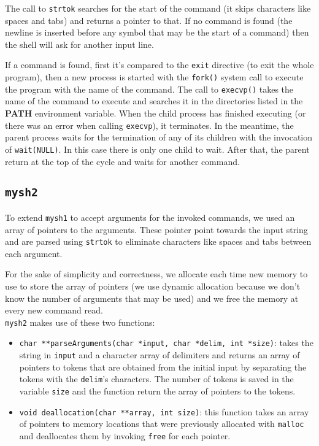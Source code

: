 The call to \texttt{strtok} searches for the start of the command (it skips characters like spaces and tabs) and returns a pointer to that. If no command is found (the newline is inserted before any symbol that may be the start of a command) then the shell will ask for another input line. \newline

If a command is found, first it's compared to the \texttt{exit} directive (to exit the whole program), then a new process is started with the \texttt{fork()} system call to execute the program with the name of the command. The call to \texttt{execvp()} takes the name of the command to execute and searches it in the directories listed in the \textbf{PATH} environment variable.
When the child process has finished executing (or there was an error when calling \texttt{execvp}), it terminates. In the meantime, the parent process waits for the termination of any of its children with the invocation of \texttt{wait(NULL)}. In this case there is only one child to wait. After that, the parent return at the top of the cycle and waits for another command.
\subsection{\texttt{mysh2}}
To extend \texttt{mysh1} to accept arguments for the invoked commands, we used an array of pointers to the arguments. These pointer point towards the input string and are parsed using \texttt{strtok} to eliminate characters like spaces and tabs between each argument. \newline

For the sake of simplicity and correctness, we allocate each time new memory to use to store the array of pointers (we use dynamic allocation because we don't know the number of arguments that may be used) and we free the memory at every new command read. \\ 

\texttt{mysh2} makes use of these two functions:
\begin{itemize}
\item{\texttt{char **parseArguments(char *input, char *delim, int *size)}}: takes the string in \texttt{input} and a character array of delimiters and returns an array of pointers to tokens that are obtained from the initial input by separating the tokens with the \texttt{delim}'s characters. The number of tokens is saved in the variable \texttt{size} and the function return the array of pointers to the tokens.
\item{\texttt{void deallocation(char **array, int size)}}: this function takes an array of pointers to memory locations that were previously allocated with \texttt{malloc} and deallocates them by invoking \texttt{free} for each pointer.
\end{itemize}

